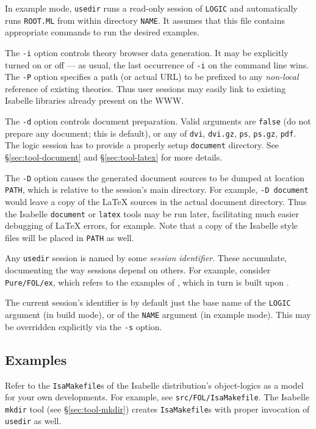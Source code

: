 In example mode, \texttt{usedir} runs a read-only session of \texttt{LOGIC}
and automatically runs \texttt{ROOT.ML} from within directory \texttt{NAME}.
It assumes that this file contains appropriate {\ML} commands to run the
desired examples.

\medskip The \texttt{-i} option controls theory browser data generation. It
may be explicitly turned on or off --- as usual, the last occurrence of
\texttt{-i} on the command line wins.  The \texttt{-P} option specifies a path
(or actual URL) to be prefixed to any \emph{non-local} reference of existing
theories.  Thus user sessions may easily link to existing Isabelle libraries
already present on the WWW.

\medskip The \texttt{-d} option controls document preparation.  Valid
arguments are \texttt{false} (do not prepare any document; this is default),
or any of \texttt{dvi}, \texttt{dvi.gz}, \texttt{ps}, \texttt{ps.gz},
\texttt{pdf}.  The logic session has to provide a properly setup
\texttt{document} directory.  See \S\ref{sec:tool-document} and
\S\ref{sec:tool-latex} for more details.

\medskip The \texttt{-D} option causes the generated document sources to be
dumped at location \texttt{PATH}, which is relative to the session's main
directory.  For example, \texttt{-D document} would leave a copy of the
{\LaTeX} sources in the actual document directory.  Thus the Isabelle
\texttt{document} or \texttt{latex} tools may be run later, facilitating much
easier debugging of {\LaTeX} errors, for example.  Note that a copy of the
Isabelle style files will be placed in \texttt{PATH} as well.

\medskip Any \texttt{usedir} session is named by some \emph{session
  identifier}. These accumulate, documenting the way sessions depend on
others. For example, consider \texttt{Pure/FOL/ex}, which refers to the
examples of {\FOL}, which in turn is built upon {\Pure}.

The current session's identifier is by default just the base name of the
\texttt{LOGIC} argument (in build mode), or of the \texttt{NAME} argument (in
example mode). This may be overridden explicitly via the \texttt{-s} option.


\subsection*{Examples}

Refer to the \texttt{IsaMakefile}s of the Isabelle distribution's
object-logics as a model for your own developments.  For example, see
\texttt{src/FOL/IsaMakefile}.  The Isabelle \texttt{mkdir} tool (see
\S\ref{sec:tool-mkdir}) creates \texttt{IsaMakefile}s with proper invocation
of \texttt{usedir} as well.


